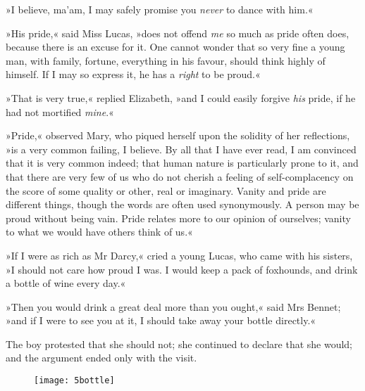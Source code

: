»I believe, ma'am, I may safely promise you \textit{never} to dance with him.«

»His pride,« said Miss Lucas, »does not offend \textit{me} so much as pride often does, because there is an excuse for it. One cannot wonder that so very fine a young man, with family, fortune, everything in his favour, should think highly of himself. If I may so express it, he has a \textit{right} to be proud.«

»That is very true,« replied Elizabeth, »and I could easily forgive \textit{his} pride, if he had not mortified \textit{mine}.«

»Pride,« observed Mary, who piqued herself upon the solidity of her reflections, »is a very common failing, I believe. By all that I have ever read, I am convinced that it is very common indeed; that human nature is particularly prone to it, and that there are very few of us who do not cherish a feeling of self-complacency on the score of some quality or other, real or imaginary. Vanity and pride are different things, though the words are often used synonymously. A person may be proud without being vain. Pride relates more to our opinion of ourselves; vanity to what we would have others think of us.«

»If I were as rich as Mr Darcy,« cried a young Lucas, who came with his sisters, »I should not care how proud I was. I would keep a pack of foxhounds, and drink a bottle of wine every day.«

»Then you would drink a great deal more than you ought,« said Mrs Bennet; »and if I were to see you at it, I should take away your bottle directly.«

The boy protested that she should not; she continued to declare that she would; and the argument ended only with the visit.

\begin{figure}[b!]
\centering
\texttt{[image: 5bottle]}
\end{figure}